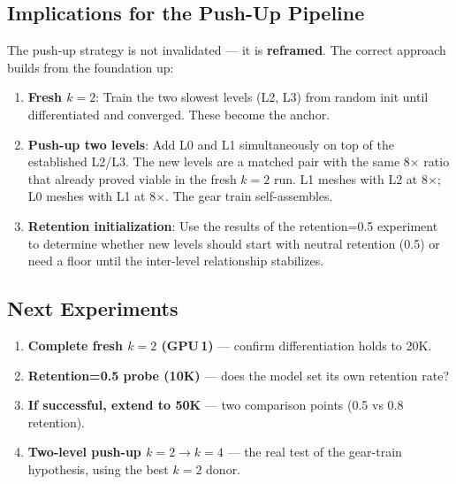 \documentclass[11pt,a4paper]{article}
\begin{document}
\subsection{Implications for the Push-Up Pipeline}

The push-up strategy is not invalidated --- it is \textbf{reframed}. The correct approach
builds from the foundation up:

\begin{enumerate}[topsep=4pt, itemsep=2pt]
    \item \textbf{Fresh $k{=}2$}: Train the two slowest levels (L2, L3) from random init until
    differentiated and converged. These become the anchor.

    \item \textbf{Push-up two levels}: Add L0 and L1 simultaneously on top of the established
    L2/L3. The new levels are a matched pair with the same 8$\times$ ratio that already proved
    viable in the fresh $k{=}2$ run. L1 meshes with L2 at 8$\times$; L0 meshes with L1 at
    8$\times$. The gear train self-assembles.

    \item \textbf{Retention initialization}: Use the results of the retention=0.5 experiment
    to determine whether new levels should start with neutral retention (0.5) or need a floor
    until the inter-level relationship stabilizes.
\end{enumerate}

\subsection{Next Experiments}

\begin{enumerate}[topsep=4pt, itemsep=2pt]
    \item \textbf{Complete fresh $k{=}2$ (GPU\,1)} --- confirm differentiation holds to 20K.
    \item \textbf{Retention=0.5 probe (10K)} --- does the model set its own retention rate?
    \item \textbf{If successful, extend to 50K} --- two comparison points (0.5 vs 0.8 retention).
    \item \textbf{Two-level push-up $k{=}2 \to k{=}4$} --- the real test of the gear-train
    hypothesis, using the best $k{=}2$ donor.
\end{enumerate}
\end{document}
